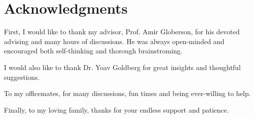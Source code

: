 \thispagestyle{empty}

\section*{Acknowledgments}

First, I would like to thank my advisor, Prof. Amir Globerson, for his devoted advising and many hours of discussions. He was always open-minded and encouraged both self-thinking and thorough brainstroming.

I would also like to thank Dr. Yoav Goldberg for great insights and thoughtful suggestions.

To my officemates, for many discussions, fun times and being ever-willing to help.

Finally, to my loving family, thanks for your endless support and patience. 